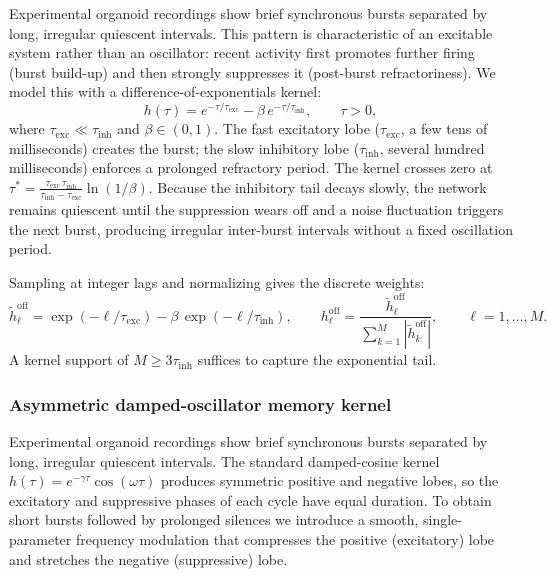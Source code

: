 \documentclass[11pt]{article}
\begin{document}
Experimental organoid recordings show brief synchronous bursts
separated by long, irregular quiescent intervals.  This pattern is
characteristic of an excitable system rather than an oscillator:
recent activity first promotes further firing (burst build-up)
and then strongly suppresses it (post-burst refractoriness).
We model this with a difference-of-exponentials kernel:
\begin{equation}
  h(\tau) = e^{-\tau/\tau_{\mathrm{exc}}}
          - \beta\,e^{-\tau/\tau_{\mathrm{inh}}},
  \qquad \tau>0,
\end{equation}
where $\tau_{\mathrm{exc}}\ll\tau_{\mathrm{inh}}$ and
$\beta\in(0,1)$.
The fast excitatory lobe ($\tau_{\mathrm{exc}}$, a few tens of
milliseconds) creates the burst; the slow inhibitory lobe
($\tau_{\mathrm{inh}}$, several hundred milliseconds) enforces a
prolonged refractory period.
The kernel crosses zero at
$\tau^{*}=\frac{\tau_{\mathrm{exc}}\,\tau_{\mathrm{inh}}}
               {\tau_{\mathrm{inh}}-\tau_{\mathrm{exc}}}
 \ln(1/\beta)$.
Because the inhibitory tail decays slowly, the network remains
quiescent until the suppression wears off and a noise fluctuation
triggers the next burst, producing irregular inter-burst intervals
without a fixed oscillation period.

Sampling at integer lags and normalizing gives the discrete
weights:
\begin{equation}
  \tilde{h}^{\mathrm{off}}_\ell
  = \exp(-\ell/\tau_{\mathrm{exc}})
  - \beta\,\exp(-\ell/\tau_{\mathrm{inh}}),
  \qquad
  h^{\mathrm{off}}_\ell
  = \frac{\tilde{h}^{\mathrm{off}}_\ell}
         {\sum_{k=1}^{M}|\tilde{h}^{\mathrm{off}}_k|},
  \qquad \ell=1,\dots,M.
  \label{eq:mem_kernel}
\end{equation}
A kernel support of $M\geq 3\tau_{\mathrm{inh}}$ suffices to
capture the exponential tail.


\subsubsection{Asymmetric damped-oscillator memory kernel}

Experimental organoid recordings show brief synchronous bursts
separated by long, irregular quiescent intervals.  The standard
damped-cosine kernel $h(\tau)=e^{-\gamma\tau}\cos(\omega\tau)$
produces symmetric positive and negative lobes, so the excitatory
and suppressive phases of each cycle have equal duration.  To
obtain short bursts followed by prolonged silences we introduce a
smooth, single-parameter frequency modulation that compresses the
positive (excitatory) lobe and stretches the negative
(suppressive) lobe.
\end{document}

